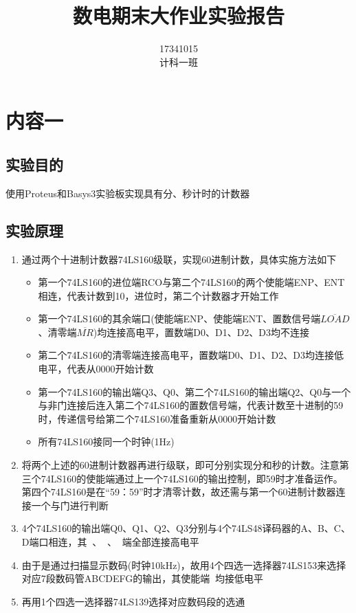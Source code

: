 \documentclass[11pt,UTF8]{ctexart}
\title{数电期末大作业实验报告}
\author{17341015\quad数据科学与计算机学院\\计科一班\quad陈鸿峥}
\date{}
\newcommand{\ol}[1]{\mathop{\overline{#1}}}%
\begin{document}
\maketitle
\vspace{-50pt}%
\lstset{language=C++,escapechar=`}

\section{内容一}
\subsection{实验目的}
使用Proteus和Basys3实验板实现具有分、秒计时的计数器

\subsection{实验原理}
\begin{enumerate}
    \item 通过两个十进制计数器74LS160级联，实现60进制计数，具体实施方法如下
    \begin{itemize}
        \item 第一个74LS160的进位端RCO与第二个74LS160的两个使能端ENP、ENT相连，代表计数到10，进位时，第二个计数器才开始工作
        \item 第一个74LS160的其余端口(使能端ENP、使能端ENT、置数信号端$\overline{LOAD}$、清零端$\overline{MR}$)均连接高电平，置数端D0、D1、D2、D3均不连接
        \item 第二个74LS160的清零端连接高电平，置数端D0、D1、D2、D3均连接低电平，代表从0000开始计数
        \item 第一个74LS160的输出端Q3、Q0、第二个74LS160的输出端Q2、Q0与一个与非门连接后连入第二个74LS160的置数信号端，代表计数至十进制的59时，传递信号给第二个74LS160准备重新从0000开始计数
        \item 所有74LS160接同一个时钟(1Hz)
    \end{itemize}
    \item 将两个上述的60进制计数器再进行级联，即可分别实现分和秒的计数。注意第三个74LS160的使能端通过上一个74LS160的输出控制，即59时才准备运作。第四个74LS160是在``59：59''时才清零计数，故还需与第一个60进制计数器连接一个与门进行判断
    \item 4个74LS160的输出端Q0、Q1、Q2、Q3分别与4个74LS48译码器的A、B、C、D端口相连，其$\ol{BI/RBO}$、$\ol{RBI}$、$\ol{LT}$端全部连接高电平
    \item 由于是通过扫描显示数码(时钟10kHz)，故用4个四选一选择器74LS153来选择对应7段数码管ABCDEFG的输出，其使能端$\ol{E}$均接低电平
    \item 再用1个四选一选择器74LS139选择对应数码段的选通
\end{enumerate}
\end{document}
